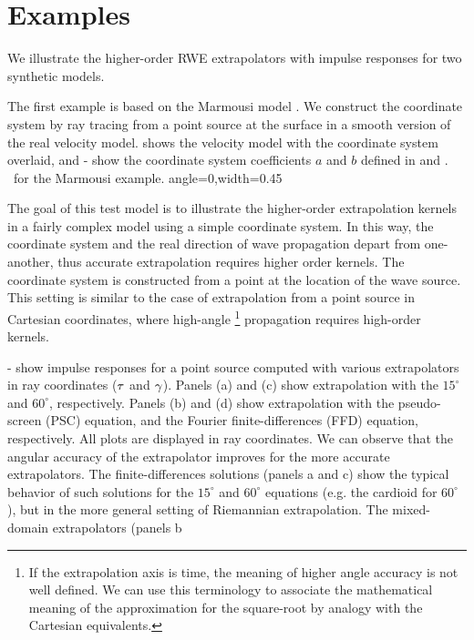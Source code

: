 \section{Examples}
We illustrate the higher-order RWE extrapolators with impulse
responses for two synthetic models.
\par
The first example is based on the Marmousi model
\cite[]{TLE13-09-09270936}. We construct the coordinate system by ray
tracing from a point source at the surface in a smooth version of the
real velocity model.  shows the velocity model with the
coordinate system overlaid, and - show
the coordinate system coefficients $a$ and $b$ defined in 
and .
{\COSlabel~for the Marmousi example.}
{angle=0,width=0.45\textwidth}
{\ABlabel}
\par
The goal of this test model is to illustrate the higher-order
extrapolation kernels in a fairly complex model using a simple
coordinate system. In this way, the coordinate system and the real
direction of wave propagation depart from one-another, thus accurate
extrapolation requires higher order kernels. The coordinate system is
constructed from a point at the location of the wave source. This
setting is similar to the case of extrapolation from a point source in
Cartesian coordinates, where high-angle
\footnote{
If the extrapolation axis is time, the meaning of higher angle
accuracy is not well defined. We can use this terminology to associate
the mathematical meaning of the approximation for the square-root by
analogy with the Cartesian equivalents.  } propagation requires
high-order kernels.
\par
{}- show impulse responses for a 
point source computed with various extrapolators in ray coordinates
($\tau$ and $\gamma$). Panels (a) and (c) show extrapolation with the
$15^\circ$ and $60^\circ$, respectively. Panels (b) and (d) show
extrapolation with the pseudo-screen (PSC) equation, and the Fourier
finite-differences (FFD) equation, respectively. All plots are
displayed in ray coordinates. We can observe that the angular accuracy
of the extrapolator improves for the more accurate extrapolators. The
finite-differences solutions (panels a and c) show the typical
behavior of such solutions for the $15^\circ$ and $60^\circ$ equations
(e.g.  the cardioid for $60^\circ$), but in the more general setting
of Riemannian extrapolation. The mixed-domain extrapolators (panels b

